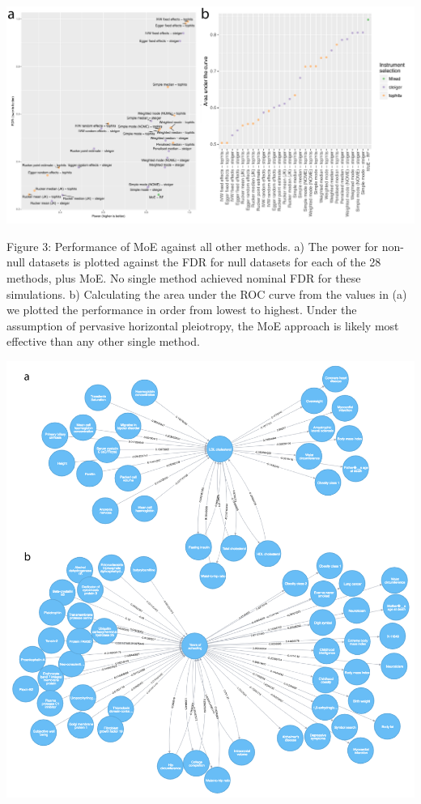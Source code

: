 \documentclass[]{article}
\begin{document}
\includegraphics{images/fig3.pdf}

Figure 3: Performance of MoE against all other methods. a) The power for
non-null datasets is plotted against the FDR for null datasets for each
of the 28 methods, plus MoE. No single method achieved nominal FDR for
these simulations. b) Calculating the area under the ROC curve from the
values in (a) we plotted the performance in order from lowest to
highest. Under the assumption of pervasive horizontal pleiotropy, the
MoE approach is likely most effective than any other single method.

\newpage

\includegraphics{images/fig4-01.png}
\end{document}
